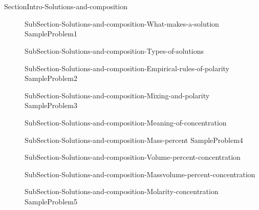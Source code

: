 \documentclass[main.tex]{subfiles} %
\newcommand\chapterlabel{Ch-electrolytes}\setcounter{figurenewcounter}{0}\setcounter{tablenewcounter}{0}\setcounter{formulanewcounter}{0}
\begin{document}
\section{\color{blue!30!black}{Solutions and composition}}
{SectionIntro-Solutions-and-composition}
\sloppy\begin{description}
\item[]{SubSection-Solutions-and-composition-What-makes-a-solution}
{SampleProblem1}
\item[] {SubSection-Solutions-and-composition-Types-of-solutions}
 \hspace{-0cm}{Figure-Dissolution}
\item[] {SubSection-Solutions-and-composition-Empirical-rules-of-polarity}
{SampleProblem2}
\item[]{SubSection-Solutions-and-composition-Mixing-and-polarity}
 \hspace{2cm}{Table-Polarity-and-mixing}	
{SampleProblem3}
\item[]
{SubSection-Solutions-and-composition-Meaning-of-concentration}
\item[]{SubSection-Solutions-and-composition-Mass-percent}
{SampleProblem4}
\item[] {SubSection-Solutions-and-composition-Volume-percent-concentration}
\item[]{SubSection-Solutions-and-composition-Massvolume-percent-concentration}
\item[]{SubSection-Solutions-and-composition-Molarity-concentration}
{SampleProblem5}



\end{description}
\end{document}
